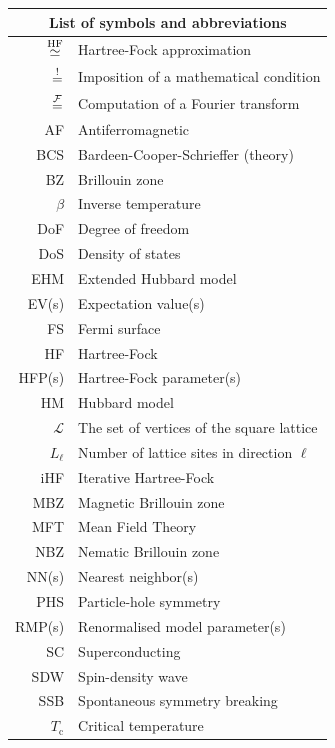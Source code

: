 
	\thispagestyle{plain}
	\begin{table}
		\centering
		\begin{tabular}{r l}
			\multicolumn{2}{c}{\textbf{List of symbols and abbreviations}} \\
			\midrule
			$\stackrel{\mathrm{HF}}{\simeq}$ & Hartree-Fock approximation \\
			$\stackrel{!}{=}$ & Imposition of a mathematical condition \\
			$\stackrel{\mathcal{F}}{=}$ & Computation of a Fourier transform \\
			\midrule
			AF & Antiferromagnetic \\
			BCS & Bardeen-Cooper-Schrieffer (theory) \\
			BZ & Brillouin zone \\
			$\beta$ & Inverse temperature \\
			DoF & Degree of freedom \\
			DoS & Density of states \\
			EHM & Extended Hubbard model \\
			EV(s) & Expectation value(s) \\
			FS & Fermi surface \\
			HF & Hartree-Fock \\
			HFP(s) & Hartree-Fock parameter(s) \\
			HM & Hubbard model \\
			$\mathcal{L}$ & The set of vertices of the square lattice \\
			$L_\ell$ & Number of lattice sites in direction $\ell$ \\
			iHF & Iterative Hartree-Fock \\
			MBZ & Magnetic Brillouin zone \\
			MFT & Mean Field Theory \\
			NBZ & Nematic Brillouin zone \\
			NN(s) & Nearest neighbor(s) \\
			PHS & Particle-hole symmetry \\
			RMP(s) & Renormalised model parameter(s) \\
			SC & Superconducting \\
			SDW & Spin-density wave \\
			SSB & Spontaneous symmetry breaking \\
			$T_\mathrm{c}$ & Critical temperature \\
			\midrule
		\end{tabular}
	\end{table}
\restoregeometry 
